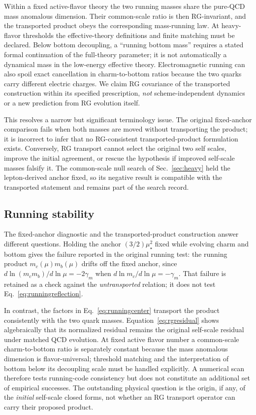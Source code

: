 \documentclass[aps,twocolumn,superscriptaddress,nofootinbib,floatfix]{revtex4-2}
\newcommand{\mstar}{\mu_\star}
\begin{document}
Within a fixed active-flavor theory the two running masses share the pure-QCD mass anomalous dimension. Their common-scale ratio is then RG-invariant, and the transported product obeys the corresponding mass-running law. At heavy-flavor thresholds the effective-theory definitions and finite matching must be declared. Below bottom decoupling, a ``running bottom mass'' requires a stated formal continuation of the full-theory parameter; it is not automatically a dynamical mass in the low-energy effective theory. Electromagnetic running can also spoil exact cancellation in charm-to-bottom ratios because the two quarks carry different electric charges. We claim RG covariance of the transported construction within its specified prescription, \emph{not} scheme-independent dynamics or a new prediction from RG evolution itself.

This resolves a narrow but significant terminology issue. The original fixed-anchor comparison fails when both masses are moved without transporting the product; it is incorrect to infer that no RG-consistent transported-product formulation exists. Conversely, RG transport cannot select the original two self scales, improve the initial agreement, or rescue the hypothesis if improved self-scale masses falsify it. The common-scale null search of Sec.~\ref{sec:heavy} held the lepton-derived anchor fixed, so its negative result is compatible with the transported statement and remains part of the search record.

\subsection{Running stability}
\label{sec:stability}

The fixed-anchor diagnostic and the transported-product construction answer different questions. Holding the anchor $(3/2)\mstar^2$ fixed while evolving charm and bottom gives the failure reported in the original running test: the running product $m_c(\mu)m_b(\mu)$ drifts off the fixed anchor, since $d\ln(m_cm_b)/d\ln\mu=-2\gamma_m$ when $d\ln m_c/d\ln\mu=-\gamma_m$. That failure is retained as a check against the \emph{untransported} relation; it does not test Eq.~\eqref{eq:runningreflection}.

In contrast, the factors in Eq.~\eqref{eq:runningcenter} transport the product consistently with the two quark masses. Equation~\eqref{eq:rgresidual} shows algebraically that its normalized residual remains the original self-scale residual under matched QCD evolution. At fixed active flavor number a common-scale charm-to-bottom ratio is separately constant because the mass anomalous dimension is flavor-universal; threshold matching and the interpretation of bottom below its decoupling scale must be handled explicitly. A numerical scan therefore tests running-code consistency but does not constitute an additional set of empirical successes. The outstanding physical question is the origin, if any, of the \emph{initial} self-scale closed forms, not whether an RG transport operator can carry their proposed product.
\end{document}
